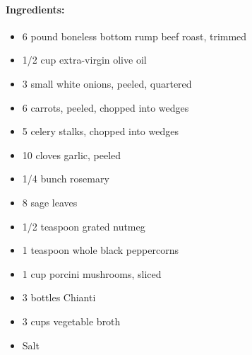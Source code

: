 \documentclass{article}
\begin{document}
\paragraph{Ingredients:}
\begin{itemize}
    \item 6 pound boneless bottom rump beef roast, trimmed
    \item 1/2 cup extra-virgin olive oil
    \item 3 small white onions, peeled, quartered
    \item 6 carrots, peeled, chopped into wedges
    \item 5 celery stalks, chopped into wedges
    \item 10 cloves garlic, peeled
    \item 1/4 bunch rosemary
    \item 8 sage leaves
    \item 1/2 teaspoon grated nutmeg
    \item 1 teaspoon whole black peppercorns
    \item 1 cup porcini mushrooms, sliced
    \item 3 bottles Chianti
    \item 3 cups vegetable broth
    \item Salt
\end{itemize}
\end{document}
